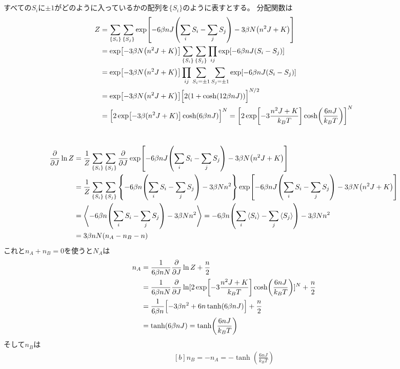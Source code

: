 \documentclass[../ap_2008.tex]{subfiles}
\begin{document}
\section{}
すべての\(S_i\)に\(\pm 1\)がどのように入っているかの配列を\(\{S_i\}\)のように表すとする。
分配関数は
\begin{equation}\begin{aligned}[b]
    Z &= \sum_{\{S_i\}}\sum_{\{S_j\}}\exp[-6\beta nJ\qty(\sum_i S_i - \sum_j S_j)-3\beta N\qty(n^2J+K)]\\
    &= \exp[-3\beta N\qty(n^2J+K)]\sum_{\{S_i\}}\sum_{\{S_j\}}\prod_{ij}\exp[-6\beta nJ\qty(S_i - S_j)]\\
    &= \exp[-3\beta N\qty(n^2J+K)]\prod_{ij} \sum_{S_i = \pm 1}\sum_{S_j = \pm 1}\exp[-6\beta nJ\qty(S_i - S_j)]\\
    &= \exp[-3\beta N\qty(n^2J+K)]\Bigl[2(1+\cosh(12\beta nJ))\Bigr]^{N/2}\\
    &= \Bigl[2\exp[-3\beta(n^2J+K)]\cosh(6\beta nJ)\Bigr]^N
    =  \qty[2\exp[-3\frac{n^2J+K}{k_BT}]\cosh(\frac{6nJ}{k_BT})]^N
\end{aligned}\end{equation}

\section{}
\begin{equation}\begin{aligned}[b]
    \pdv{J}\ln Z
    &= \frac{1}{Z}\sum_{\{S_i\}}\sum_{\{S_j\}}\pdv{J} \exp[-6\beta nJ\qty(\sum_i S_i - \sum_j S_j)-3\beta N\qty(n^2J+K)]\\
    &= \frac{1}{Z}\sum_{\{S_i\}}\sum_{\{S_j\}}\qty{-6\beta n\qty(\sum_i S_i - \sum_j S_j)-3\beta Nn^2} \exp[-6\beta nJ\qty(\sum_i S_i - \sum_j S_j)-3\beta N\qty(n^2J+K)]\\
    &= \ev{-6\beta n\qty(\sum_i S_i - \sum_j S_j)-3\beta Nn^2}
    = -6\beta n\qty(\sum_i \ev{S_i} - \sum_j \ev{S_j})-3\beta Nn^2\\
    &= 3\beta nN\qty(n_A-n_B-n)
\end{aligned}\end{equation}
これと\(n_A+n_B = 0\)を使うと\(N_A\)は
\begin{equation}\begin{aligned}[b]
    n_A &= \frac{1}{6\beta nN}\pdv{J}\ln Z +\frac{n}{2}\\
    &= \frac{1}{6\beta nN}\pdv{J}\ln[2\exp[-3\frac{n^2J+K}{k_BT}]\cosh(\frac{6nJ}{k_BT})]^N + \frac{n}{2}\\
    &= \frac{1}{6\beta n}\Bigl[-3\beta n^2+6n\tanh(6\beta n J)\Bigr] + \frac{n}{2}\\
    &= \tanh(6\beta nJ) = \tanh(\frac{6nJ}{k_BT})
\end{aligned}\end{equation}
そして\(n_B\)は
\begin{equation}\begin{aligned}[b]
    n_B = -n_A = -\tanh(\frac{6nJ}{k_BT})
\end{aligned}\end{equation}
\end{document}
